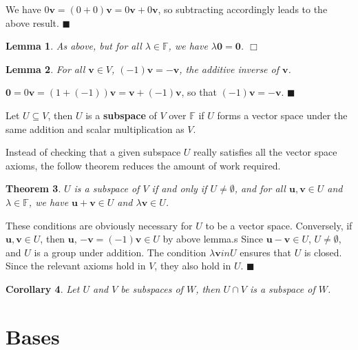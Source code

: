 \documentclass[letter-paper]{tufte-book}
\newtheorem{theorem}{\color{pastel-blue}Theorem}[section]
\newtheorem{lemma}[theorem]{\color{pastel-blue}Lemma}
\newtheorem{corollary}[theorem]{\color{pastel-blue}Corollary}
\newenvironment{proof}[1][Proof]{\begin{trivlist}
\item[\hskip \labelsep {\bfseries #1}]}{\end{trivlist}}
\newcommand{\Ob}{{\boldsymbol{0}}}
\newcommand{\ub}{{\boldsymbol{u}}}
\newcommand{\vb}{{\boldsymbol{v}}}
\newcommand{\qed}{\hfill$\blacksquare$}
\newcommand{\qedwhite}{\hfill \ensuremath{\Box}}
\begin{document}
\begin{proof}
  We have $0\vb = (0 + 0)\vb = 0\vb + 0\vb$, so subtracting accordingly leads to the above result. \qed
\end{proof}

\begin{lemma}
  As above, but for all $\lambda \in \mathbb{F}$, we have $\lambda \Ob = \Ob$. \qedwhite
\end{lemma}

\begin{lemma}
  For all $\vb\in V$, $(-1)\vb = -\vb$, the additive inverse of $\vb$.
\end{lemma}

\begin{proof}
  $\Ob = 0\vb = (1 + (-1))\vb = \vb + (-1)\vb$, so that $(-1)\vb =
  -\vb$. \qed
\end{proof}

Let $U \subseteq V$, then $U$ is a \textbf{subspace} of $V$ over $\mathbb{F}$ if $U$ forms a vector space under the same addition and scalar multiplication as $V$.

Instead of checking that a given subspace $U$ really satisfies all the vector space axioms, the follow theorem reduces the amount of work required.

\begin{theorem}
  $U$ is a subspace of $V$ if and only if $U \neq \emptyset$, and for all $\ub, \vb \in U$ and $\lambda \in \mathbb{F}$, we have $\ub + \vb \in U$ and $\lambda \vb \in U$.
\end{theorem}

\begin{proof}
  These conditions are obviously necessary for $U$ to be a vector space. Conversely, if $\ub, \vb \in U$, then $\ub$, $-\vb = (-1)\vb \in U$ by above lemma.s Since $\ub - \vb \in U$, $U \neq \emptyset$, and $U$ is a group under addition. The condition $\lambda \vb in U$ ensures that $U$ is closed. Since the relevant axioms hold in $V$, they also hold in $U$. \qed
\end{proof}

\begin{corollary}
  Let $U$ and $V$ be subspaces of $W$, then $U \cap V$ is a subspace of $W$.
\end{corollary}


\section{Bases}
\end{document}
